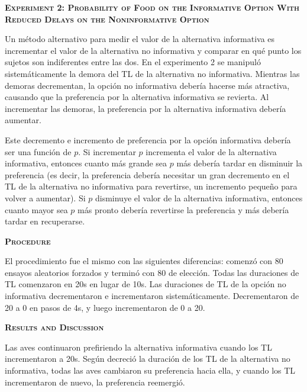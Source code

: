 \documentclass[a4paper,12pt]{article}
\begin{document}
{\scshape\bfseries Experiment 2: Probability of Food on the Informative Option With Reduced Delays on the Noninformative Option}

Un método alternativo para medir el valor de la alternativa informativa es incrementar el valor de la alternativa no informativa y comparar en qué punto los sujetos son indiferentes entre las dos. En el experimento 2 se manipuló sistemáticamente la demora del TL de la alternativa no informativa. Mientras  las demoras decrementan, la opción no informativa debería hacerse más atractiva, causando que la preferencia por la alternativa informativa se revierta. Al incrementar las demoras, la preferencia por la alternativa informativa debería aumentar.

Este decremento e incremento de preferencia por la opción informativa debería ser una función de $p$. Si incrementar $p$ incrementa el valor de la alternativa informativa, entonces cuanto más grande sea $p$ más debería tardar en disminuir la preferencia (es decir, la preferencia debería necesitar un gran decremento en el TL de la alternativa no informativa para revertirse, un incremento pequeño para volver a aumentar). Si $p$ disminuye el valor de la alternativa informativa, entonces cuanto mayor sea $p$ más pronto debería revertirse la preferencia y más debería tardar en recuperarse.

{\scshape\bfseries Procedure}

El procedimiento fue el mismo con las siguientes diferencias: comenzó con 80 ensayos aleatorios forzados y terminó con 80 de elección. Todas las duraciones de TL comenzaron en 20s en lugar de 10s. Las duraciones de TL de la opción no informativa decrementaron e incrementaron sistemáticamente. Decrementaron de 20 a 0 en pasos de 4s, y luego incrementaron de 0 a 20.

{\scshape\bfseries Results and Discussion}

Las aves continuaron prefiriendo la alternativa informativa cuando los TL incrementaron a 20s. Según decreció la duración de los TL de la alternativa no informativa, todas las aves cambiaron su preferencia hacia ella, y cuando los TL incrementaron de nuevo, la preferencia reemergió.
\end{document}
